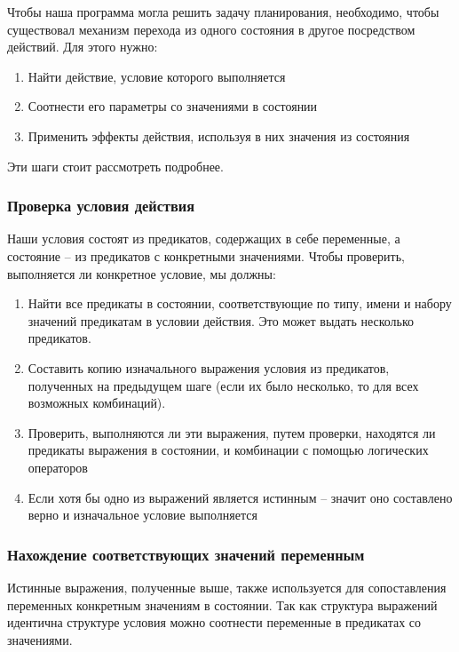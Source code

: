\documentclass{article}
\begin{document}
Чтобы наша программа могла решить задачу планирования, необходимо,
чтобы существовал механизм перехода из одного состояния в другое посредством действий.
Для этого нужно:
\begin{enumerate}
  \item Найти действие, условие которого выполняется
  \item Соотнести его параметры со значениями в состоянии
  \item Применить эффекты действия, используя в них значения из состояния
\end{enumerate}

Эти шаги стоит рассмотреть подробнее.

\subsubsection{Проверка условия действия}

Наши условия состоят из предикатов, содержащих в себе переменные,
а состояние -- из предикатов с конкретными значениями.
Чтобы проверить, выполняется ли конкретное условие,
мы должны:

\begin{enumerate}
  \item Найти все предикаты в состоянии, соответствующие по типу,
    имени и набору значений предикатам в условии действия. Это может выдать несколько предикатов.
  \item Составить копию изначального выражения условия из предикатов,
    полученных на предыдущем шаге (если их было несколько, то для всех возможных комбинаций).
  \item Проверить, выполняются ли эти выражения, путем проверки, находятся ли предикаты выражения в состоянии,
    и комбинации с помощью логических операторов
  \item Если хотя бы одно из выражений является истинным -- значит оно составлено верно и изначальное условие выполняется
\end{enumerate}

\subsubsection{Нахождение соответствующих значений переменным}

Истинные выражения, полученные выше, также используется для сопоставления переменных конкретным значениям в состоянии.
Так как структура выражений идентична структуре условия можно соотнести переменные в предикатах со значениями.
\end{document}
